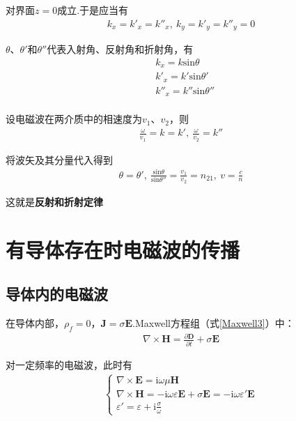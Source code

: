 \documentclass[main.tex]{subfiles}
\begin{document}
对界面$z = 0$成立.于是应当有
\begin{align}
    k_x = k'_x = k''_x,\ k_y = k'_y = k''_y = 0
\end{align}

$\theta$、$\theta '$和$\theta ''$代表入射角、反射角和折射角，有
\begin{align}
    &k_x = k \mathrm{sin}\theta\\
    &k'_x = k' \mathrm{sin}\theta '\\
    &k''_x = k'' \mathrm{sin}\theta ''\\
\end{align}

设电磁波在两介质中的相速度为$v_1$、$v_2$，则
\begin{align}
    \frac{\omega}{v_1} = k = k',\ \frac{\omega}{v_2} = k''
\end{align}

将波矢及其分量代入得到
\begin{align}
    \label{fanshezheshe}\theta = \theta ',\ \frac{\mathrm{sin}\theta}{\mathrm{sin}\theta''} = \frac{v_1}{v_2} = n_{21},\ v = \frac{c}{n}
\end{align}

这就是\textbf{反射和折射定律}

\section{有导体存在时电磁波的传播}
\subsection{导体内的电磁波}

在导体内部，$\rho _f = 0$，$\boldsymbol{J} = \sigma \boldsymbol{E}$.Maxwell方程组（式\ref{Maxwell3}）中：
\begin{align}
    \nabla \times \boldsymbol{H} = \displaystyle \frac{\partial \boldsymbol{D}}{\partial t} + \sigma \boldsymbol{E}
\end{align}

对一定频率的电磁波，此时有
\begin{align}
    \left\{\begin{array}{l}
        \nabla \times \boldsymbol{E} = \mathrm{i} \omega \mu \boldsymbol{H}\\
        \nabla \times \boldsymbol{H} = -\mathrm{i}\omega \varepsilon \boldsymbol{E} + \sigma \boldsymbol{E} = -\mathrm{i}\omega \varepsilon ' \boldsymbol{E}\\
        \varepsilon ' = \varepsilon +\mathrm{i} \displaystyle \frac{\sigma}{\omega}
    \end{array}\right.
\end{align}
\end{document}
